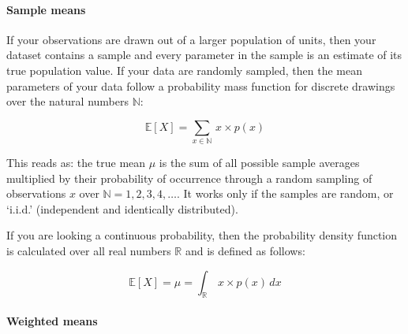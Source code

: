 




\paragraph{Sample means}


If your observations are drawn out of a larger population of units, then your dataset contains a sample and every parameter in the sample is an estimate of its true population value. If your data are randomly sampled, then the mean parameters of your data follow a probability mass function for discrete drawings over the natural numbers $\mathbb{N}$:%

  $$\mathbb{E}[X] = \sum_{x \in \mathbb{N}} \, x \times p(x)$$

This reads as: the true mean $\mu$ is the sum of all possible sample averages multiplied by their probability of occurrence through a random sampling of observations $x$ over $\mathbb{N} = 1,2,3,4,\ldots$. It works only if the samples are random, or `i.i.d.' (independent and identically distributed).%

If you are looking a continuous probability, then the probability density function is calculated over all real numbers $\mathbb{R}$ and is defined as follows:%

  $$\mathbb{E}[X] = \mu = \int_{\mathbb{R}} \, x \times p(x) \, dx$$



\paragraph{Weighted means}

% 
% 
% 

